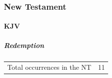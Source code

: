 				
			
		
		
	\subsubsection{New Testament} %
		\label{REDEMPTION-NT}
	
		\paragraph{KJV}
			\label{REDEMPTION-NT-KJV}
			
			\subparagraph{Redemption}
	
				\begin{tabular}{ll}
					Total occurrences in the NT & 11
				\end{tabular}
				
